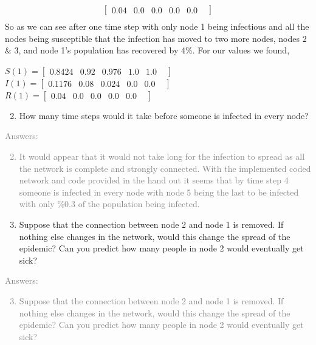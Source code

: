 \documentclass[11pt]{article}
\begin{document}
{\begin{enumerate}
\begin{align*}
\begin{bmatrix}
		0.04    	&
		0.0    	&
		0.0 		&
		0.0 		&
		0.0 		&
		\end{bmatrix}\\
\end{align*}
So as we can see after one time step with only node 1 being infectious and all the nodes being susceptible that the infection has moved to two more nodes, nodes 2 \& 3, and node 1's population has recovered by 4\%. For our values we found,\\
\begin{center}
 	$S(1)=\begin{bmatrix} 
		0.8424    &
		0.92    	&
		0.976 	&
		1.0 		&
		1.0 		&
	\end{bmatrix}$\\
 	$I(1)=\begin{bmatrix} 
		0.1176    	&
		0.08    	&
		0.024	&
		0.0 		&
		0.0 		&
	\end{bmatrix}$\\
 	$R(1)=\begin{bmatrix} 
		0.04  &
		0.0  &
		0.0  &
		0.0  &
		0.0  &
	\end{bmatrix}$\\
\end{center}
\end{enumerate}
}

\begin{enumerate}
	\setcounter{enumi}{1}
	\item How many time steps would it take before someone is infected in every node?
\end{enumerate}
\textcolor{gray}{
Answers:
\begin{enumerate}
	\setcounter{enumi}{1}
	\item It would appear that it would not take long for the infection to spread as all the network is complete and strongly connected. With the implemented coded network and code provided in the hand out it seems that by time step 4 someone is infected in every node with node 5 being the last to be infected with only \%0.3 of the population being infected.   
\end{enumerate}
}

\begin{enumerate}
	\setcounter{enumi}{2}
	\item Suppose that the connection between node 2 and node 1 is removed. If nothing else changes in the network, would this change the spread of the epidemic? Can you predict how many people in node 2 would eventually get sick?
\end{enumerate}
\textcolor{gray}{
Answers:
\begin{enumerate}
	\setcounter{enumi}{2}
	\item Suppose that the connection between node 2 and node 1 is removed. If nothing else changes in the network, would this change the spread of the epidemic? Can you predict how many people in node 2 would eventually get sick?
\end{enumerate}
}
\end{document}
